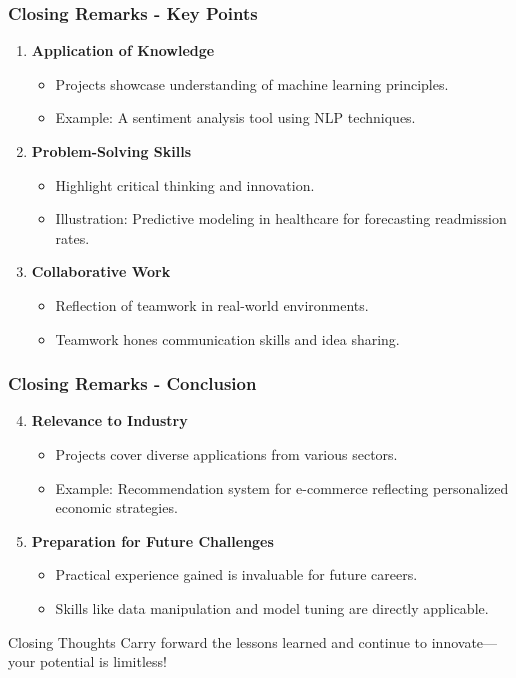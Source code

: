 \documentclass[aspectratio=169]{beamer}
\begin{document}
\begin{frame}[fragile]
    \frametitle{Closing Remarks - Key Points}
    \begin{enumerate}
        \item \textbf{Application of Knowledge}
        \begin{itemize}
            \item Projects showcase understanding of machine learning principles.
            \item Example: A sentiment analysis tool using NLP techniques.
        \end{itemize}

        \item \textbf{Problem-Solving Skills}
        \begin{itemize}
            \item Highlight critical thinking and innovation.
            \item Illustration: Predictive modeling in healthcare for forecasting readmission rates.
        \end{itemize}
        
        \item \textbf{Collaborative Work}
        \begin{itemize}
            \item Reflection of teamwork in real-world environments.
            \item Teamwork hones communication skills and idea sharing.
        \end{itemize}
    \end{enumerate}
\end{frame}

\begin{frame}[fragile]
    \frametitle{Closing Remarks - Conclusion}
    \begin{enumerate}
        \setcounter{enumi}{3}
        \item \textbf{Relevance to Industry}
        \begin{itemize}
            \item Projects cover diverse applications from various sectors.
            \item Example: Recommendation system for e-commerce reflecting personalized economic strategies.
        \end{itemize}

        \item \textbf{Preparation for Future Challenges}
        \begin{itemize}
            \item Practical experience gained is invaluable for future careers.
            \item Skills like data manipulation and model tuning are directly applicable.
        \end{itemize}
    \end{enumerate}
    \begin{block}{Closing Thoughts}
        Carry forward the lessons learned and continue to innovate—your potential is limitless!
    \end{block}
\end{frame}
\end{document}
